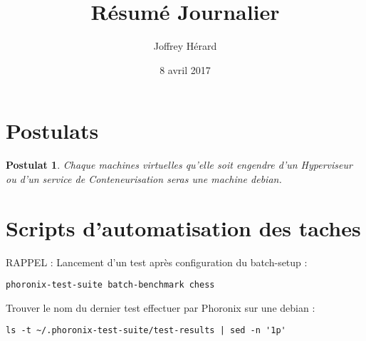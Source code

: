 \documentclass[french]{article}
\newtheorem{post}{Postulat}
\begin{document}
\title{Résumé Journalier}
\author{Joffrey Hérard}
\date{8 avril 2017} 

\maketitle

\section{Postulats}

\begin{post}
Chaque machines virtuelles qu'elle soit engendre d'un Hyperviseur ou d'un service de Conteneurisation seras une machine debian.  
\end{post}
\section{Scripts d'automatisation des taches}
RAPPEL : 
Lancement d'un test après configuration du batch-setup :

\begin{verbatim}
phoronix-test-suite batch-benchmark chess
\end{verbatim}

Trouver le nom du dernier test effectuer par Phoronix sur une debian : 
\begin{verbatim}
ls -t ~/.phoronix-test-suite/test-results | sed -n '1p'
\end{verbatim}
\newpage
\begin{thebibliography}{9}
\end{thebibliography}
\end{document}
